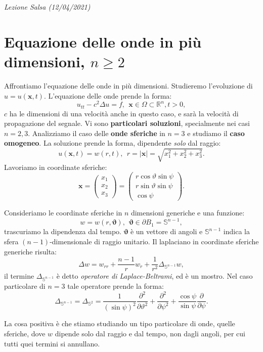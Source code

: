 \documentclass[10pt,a4paper,twoside,openright]{book}
\newcounter{conteggioS}
\newcommand{\LezioneS}[1]{
	\stepcounter{conteggioS}
	\textit{Lezione Salsa \arabic{conteggioS} (#1)}
	}
\newcommand{\x}{\mathbf{x}}
\begin{document}
\LezioneS{12/04/2021}
\section{Equazione delle onde in più dimensioni, \texorpdfstring{$n\geqslant 2$}{n>2}}

Affrontiamo l'equazione delle onde in più dimensioni. Studieremo l'evoluzione di $u=u(\x ,t)$. L'equazione delle onde prende la forma:
\begin{equation}
	u_{tt} -c^{2} \Delta u=f,\ \ \x \in \Omega \subset \mathbb{R}^{n} ,t >0,
\end{equation}
$c$ ha le dimensioni di una velocità anche in questo caso, e sarà la velocità di propagazione del segnale. Vi sono \textbf{particolari soluzioni}, specialmente nei casi $n=2,3$. Analizziamo il caso delle \textbf{onde sferiche} in $n=3$ e studiamo il \textbf{caso omogeneo}. La soluzione prende la forma, dipendente \textit{solo} dal raggio:
\begin{equation*}
	u(\x ,t) =w(r,t) ,\ \ r=| \x| =\sqrt{x_{1}^{2} +x_{2}^{2} +x_{3}^{2}} .
\end{equation*}
Lavoriamo in coordinate sferiche:
\begin{equation*}
	\x =
	\begin{pmatrix}
		x_{1} \\
		x_{2} \\
		x_{3} 
	\end{pmatrix} =
	\begin{pmatrix}
		r\cos \vartheta \sin \psi \\
		r\sin \vartheta \sin \psi \\
		\cos \psi                 
	\end{pmatrix} .
\end{equation*}
\begin{nb}
	Consideriamo le coordinate sferiche in $n$ dimensioni generiche e una funzione:
	\begin{equation*}
		w=w(r,\bm{\vartheta }) ,\ \ \bm{\vartheta } \in \partial B_{1} =\mathbb{S}^{n-1} ,
	\end{equation*}
	trascuriamo la dipendenza dal tempo. $\bm{\vartheta }$ è un vettore di angoli e $\mathbb{S}^{n-1}$ indica la sfera $(n-1)$-dimensionale di raggio unitario. Il laplaciano in coordinate sferiche generiche risulta:
	\begin{equation}
		\Delta w=w_{rr} +\frac{n-1}{r} w_{r} +\frac{1}{r^{2}} \Delta _{\mathbb{S}^{n-1}} w,
	\end{equation}
	il termine $\Delta _{\mathbb{S}^{n-1}}$ è detto \textit{operatore di Laplace-Beltrami}, ed è un mostro. Nel caso particolare di $n=3$ tale operatore prende la forma:
	\begin{equation}
		\Delta _{\mathbb{S}^{n-1}} =\Delta _{\mathbb{S}^{2}} =\frac{1}{(\sin \psi)^{2}}\frac{\partial ^{2}}{\partial \vartheta ^{2}} +\frac{\partial ^{2}}{\partial \psi ^{2}} +\frac{\cos \psi }{\sin \psi }\frac{\partial }{\partial \psi } .
	\end{equation}
\end{nb}
La cosa positiva è che stiamo studiando un tipo particolare di onde, quelle sferiche, dove $w$ dipende solo dal raggio e dal tempo, non dagli angoli, per cui tutti quei termini si annullano.
\end{document}

